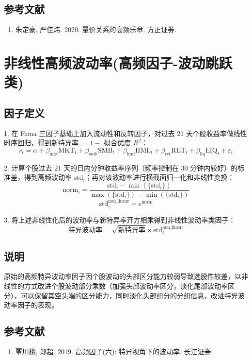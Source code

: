 \documentclass{article}
\begin{document}
\subsection{参考文献}
\begin{enumerate}
    \item 朱定豪, 严佳炜. 2020. 量价关系的高频乐章. 方正证券.
\end{enumerate}

\section{非线性高频波动率(高频因子-波动跳跃类)}

\subsection{因子定义}

1. 在 Fama 三因子基础上加入流动性和反转因子，对过去 21 天个股收益率做线性时序回归，得到新特异率 \( = 1 - \) 拟合优度 \( R^2 \)：
\begin{equation}
    r_t = \alpha + \beta_{\mathrm{mkt}} \mathrm{MKT}_t + \beta_{\mathrm{smb}} \mathrm{SMB}_t + \beta_{\mathrm{hml}} \mathrm{HML}_t + \beta_{\mathrm{ret}} \mathrm{RET}_t + \beta_{\mathrm{liq}} \mathrm{LIQ}_t + \varepsilon_t
\end{equation}

2. 计算个股过去 21 天的日内分钟收益率序列（频率控制在 30 分钟内较好）的标准差，得到高频波动率 \( \mathrm{std}_i \)；再对该波动率进行横截面归一化和非线性变换：
\begin{equation}
    \mathrm{norm}_i = \frac{\mathrm{std}_i - \min(\{\mathrm{std}_i\})}{\max(\{\mathrm{std}_i\}) - \min(\{\mathrm{std}_i\})}
\end{equation}
\begin{equation}
    \mathrm{std}_i^{\mathrm{non\_linear}} = e^{\mathrm{norm}}
\end{equation}

3. 将上述非线性化后的波动率与新特异率开方相乘得到非线性波动率类因子：
\begin{equation}
    \text{特异波动率} = \sqrt{\text{新特异率}} \times \mathrm{std}_i^{\mathrm{non\_linear}}
\end{equation}

\subsection{说明}
原始的高频特异波动率因子因个股波动的头部区分能力较弱导致选股性较差，以非线性的方式改进个股波动部分乘数（加强头部波动率区分，淡化尾部波动率区分），可以保留其空头端的区分能力，同时淡化头部组分的分组信息，改进特异波动率因子的表现。

\subsection{参考文献}
\begin{enumerate}
    \item 覃川桃, 郑超. 2019. 高频因子(六): 特异视角下的波动率. 长江证券.
\end{enumerate}
\end{document}
